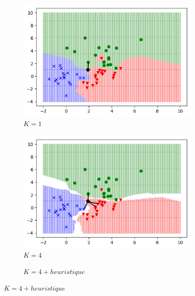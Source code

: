 \documentclass[../thesis.tex]{subfiles}
\begin{document}
    \vspace{-0.5em}
    \begin{figure}[H]
        \centering
        \begin{subfigure}[b]{0.3\textwidth}
            \centering
            \caption*{$K=1$}
            \includegraphics[width=\linewidth]{img/biblio/classification-knn-1}
        \end{subfigure}
        \begin{subfigure}[b]{0.3\textwidth}
            \centering
            \caption*{$K=4$}
            \includegraphics[width=\linewidth]{img/biblio/classification-knn-4}
        \end{subfigure}
        \begin{subfigure}[b]{0.3\textwidth}
            \centering
            \caption*{$K=4+heuristique$}

\end{subfigure}
\end{figure}
\end{document}
